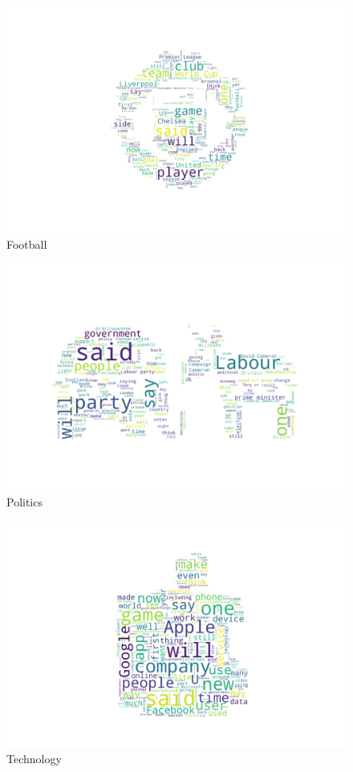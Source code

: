 \begin{figure}[H]
\centering
\includegraphics[scale=0.35]{images/Wordcloud_Football.png}
\caption{Football}
\end{figure}

\begin{figure}[H]
\centering
\includegraphics[scale=0.35]{images/Wordcloud_Politics.png}
\caption{Politics}
\end{figure}

\begin{figure}[H]
\centering
\includegraphics[scale=0.35]{images/Wordcloud_Technology.png}
\caption{Technology}
\end{figure}
\newpage
